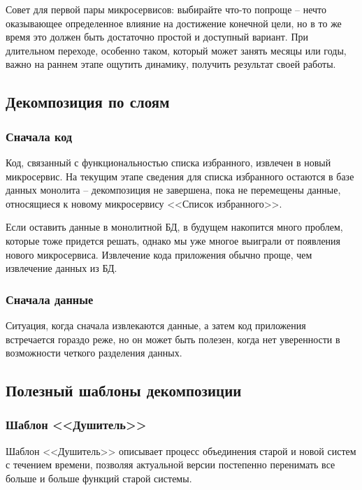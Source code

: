 \documentclass[%
	11pt,
	a4paper,
	utf8,
		]{article}
\begin{document}
Совет для первой пары микросервисов: выбирайте что-то попроще -- нечто оказывающее определенное влияние на достижение конечной цели, но в то же время это должен быть достаточно простой и доступный вариант. При длительном переходе, особенно таком, который может занять месяцы или годы, важно на раннем этапе ощутить динамику, получить результат своей работы.

\subsection{Декомпозиция по слоям}

\subsubsection{Сначала код}

Код, связанный с функциональностью списка избранного, извлечен в новый микросервис. На текущим этапе сведения для списка избранного остаются в базе данных монолита -- декомпозиция не завершена, пока не перемещены данные, относящиеся к новому микросервису <<Список избранного>>.

Если оставить данные в монолитной БД, в будущем накопится много проблем, которые тоже придется решать, однако мы уже многое выиграли от появления нового микросервиса. Извлечение кода приложения обычно проще, чем извлечение данных из БД.

\subsubsection{Сначала данные}

Ситуация, когда сначала извлекаются данные, а затем код приложения встречается гораздо реже, но он может быть полезен, когда нет уверенности в возможности четкого разделения данных.

\subsection{Полезный шаблоны декомпозиции}

\subsubsection{Шаблон <<Душитель>>}

Шаблон <<Душитель>> описывает процесс объединения старой и новой систем с течением времени, позволяя актуальной версии постепенно перенимать все больше и больше функций старой системы.
\end{document}
